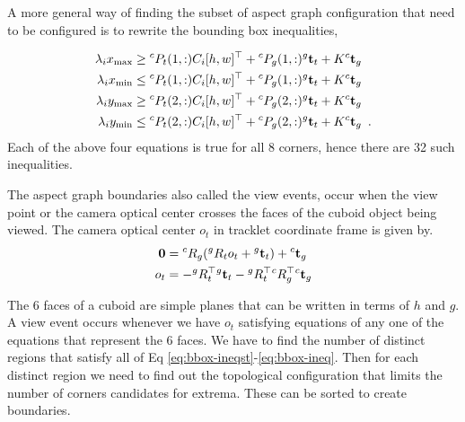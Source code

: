 A more general way of finding the subset of aspect graph configuration that
need to be configured is to rewrite the bounding box inequalities, 

\begin{align}
  \lambda_i x_{\text{max}} &\ge {}^{c}{P}_{t}(1, :) C_i [h, w]^\top + {}^{c}{P}_{g}(1, :) {}^{g}{\mathbf{t}}_{t} + K {}^{c}{\mathbf{t}}_{g}\\
  \label{eq:bbox-ineqst}
  \lambda_i x_{\text{min}} &\le {}^{c}{P}_{t}(1, :) C_i [h, w]^\top + {}^{c}{P}_{g}(1, :) {}^{g}{\mathbf{t}}_{t} + K {}^{c}{\mathbf{t}}_{g}\\
  \lambda_i y_{\text{max}} &\ge {}^{c}{P}_{t}(2, :) C_i [h, w]^\top + {}^{c}{P}_{g}(2, :) {}^{g}{\mathbf{t}}_{t} + K {}^{c}{\mathbf{t}}_{g}\\
  \lambda_i y_{\text{min}} &\le {}^{c}{P}_{t}(2, :) C_i [h, w]^\top + {}^{c}{P}_{g}(2, :) {}^{g}{\mathbf{t}}_{t} + K {}^{c}{\mathbf{t}}_{g} \enspace.
  \label{eq:bbox-ineq}
\end{align}
Each of the above four equations is true for all 8 corners, hence there are 32 such inequalities.

The aspect graph boundaries also called the view events, occur when the view
point or the camera optical center crosses the faces of the cuboid object being
viewed. The camera optical center $o_t$ in tracklet coordinate frame is given by.
\begin{align}
  \mathbf{0} &= {}^{c}{R}_{g}({}^{g}{R}_{t} o_t + {}^{g}{\mathbf{t}}_{t}) + {}^{c}{\mathbf{t}}_{g}\\
  o_t &= -{}^{g}{R}_{t}^\top {}^{g}{\mathbf{t}}_{t} -{}^{g}{R}_{t}^\top {}^{c}{R}_{g}^\top {}^{c}{\mathbf{t}}_{g}
\end{align}

The 6 faces of a cuboid are simple planes that can be written in terms of $h$
and $g$. A view event occurs whenever we have $o_t$ satisfying equations of any
one of the equations that represent the 6 faces. We have to find the number of
distinct regions that satisfy all of Eq
\eqref{eq:bbox-ineqst}-\eqref{eq:bbox-ineq}. Then for each distinct region we
need to find out the topological configuration that limits the number of
corners candidates for extrema. These can be sorted to create boundaries.


